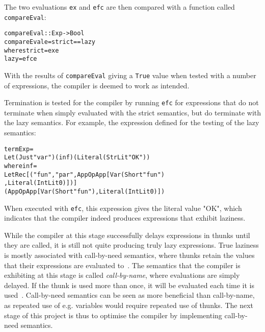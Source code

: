 \noindent The two evaluations \texttt{ex} and \texttt{efc} are then compared
with a function called \texttt{compareEval}:
\newpage
\begin{alltt}
  compareEval :: Exp -> Bool
  compareEval e = strict == lazy
    where strict = ex e
          lazy   = efc e
\end{alltt}

\noindent
With the results of \texttt{compareEval} giving a \texttt{True} value when
tested with a number of expressions, the compiler is deemed to work as intended.

Termination is tested for the compiler by running \texttt{efc} for expressions
that do not terminate when simply evaluated with the strict semantics, but do
terminate with the lazy semantics. For example, the expression defined for the
testing of the lazy semantics:

\begin{alltt}
  termExp =
    Let (Just "var") (inf) (Literal (StrLit "OK"))
    where inf =
      LetRec [("fun", "par", App OpApp [Var (Short "fun")
                                       ,Literal (IntLit 0)])]
      (App OpApp [Var (Short "fun"), Literal (IntLit 0)])
\end{alltt}

\noindent When executed with \texttt{efc}, this expression gives the literal
value "OK", which indicates that the compiler indeed produces expressions that
exhibit laziness.

While the compiler at this stage successfully delays expressions in thunks
until they are called, it is still not quite producing truly lazy expressions.
True laziness is mostly associated with call-by-need semantics, where thunks
retain the values that their expressions are evaluated to~\cite{pltbook}.
The semantics that
the compiler is exhibiting at this stage is called \textit{call-by-name}, where
evaluations are simply delayed. If the thunk is used more than once, it will
be evaluated each time it is used~\cite{DragonBook}.
Call-by-need semantics can be seen as more beneficial than call-by-name, as
repeated use of e.g. variables would require repeated use of thunks.
The next stage of this project is thus to optimise the compiler by implementing
call-by-need semantics.

